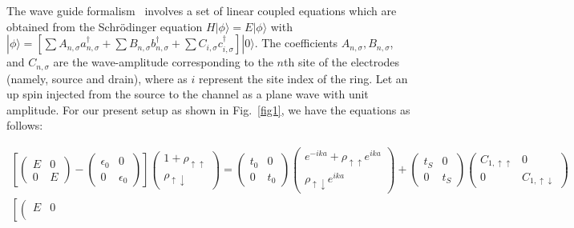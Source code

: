 \documentclass[prb,aps,twocolumn,amsmath,amssymb,floatfix,superscriptaddress]{revtex4}
\begin{document}
The wave guide formalism~\cite{ref14,ref18,ref19,ref20,ref21} involves a set of linear coupled
equations which are obtained from the Schr\"{o}dinger equation $H|\phi\rangle = E|\phi\rangle$
with $|\phi\rangle = \left[\sum A_{n,\sigma} a_{n,\sigma}^{\dagger} + \sum B_{n,\sigma}
b_{n,\sigma}^{\dagger} + \sum C_{i,\sigma} c_{i,\sigma}^{\dagger}\right]|0\rangle$.
The coefficients $A_{n,\sigma}, B_{n,\sigma}$, and $C_{n,\sigma}$
are the wave-amplitude corresponding to the $n$th site of the electrodes (namely, source
and drain), where as $i$ represent the site index of the ring. Let an up spin injected from the
source to the channel as a plane wave with unit amplitude. For our present setup as shown in
Fig.~\ref{fig1}, we have the equations as follows:
{
\allowdisplaybreaks
\begin{widetext}
{\footnotesize
\begin{eqnarray}
\left[\left(\begin{array}{cc}
        E & 0 \\
        0 & E
\end{array}\right) - \left(\begin{array}{cc}
    \epsilon_0 & 0 \\
    0 & \epsilon_0
\end{array}\right)\right]\left(\begin{array}{cc}
        1 + \rho_{\uparrow\uparrow} \\
        \rho_{\uparrow\downarrow}
    \end{array}\right) = \left(\begin{array}{cc}
    t_0 & 0 \\
    0 & t_0
\end{array}\right) \left(\begin{array}{cc}
    e^{-ika} + \rho_{\uparrow\uparrow}e^{ika} \\
        \rho_{\uparrow\downarrow}e^{ika}
    \end{array}\right) + \left(\begin{array}{cc}
   t_{S}  & 0 \\
    0 & t_{S}
\end{array}\right) \left(\begin{array}{cc}
   C_{1,\uparrow\uparrow}  & 0 \\
    0 & C_{1,\uparrow\downarrow}
\end{array}\right)\nonumber \\
\left[\left(\begin{array}{cc}
    E & 0 \\

\end{array}
\end{eqnarray}}
\end{widetext}}
\end{document}

